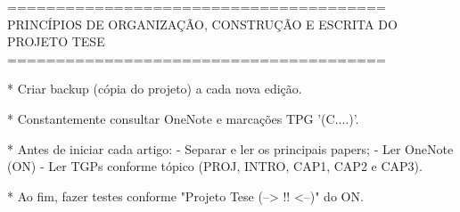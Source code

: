 =======================================
PRINCÍPIOS DE ORGANIZAÇÃO, CONSTRUÇÃO E ESCRITA DO PROJETO TESE
=======================================

* Criar backup (cópia do projeto) a cada nova edição.

* Constantemente consultar OneNote e marcações TPG '(C....)'. 

* Antes de iniciar cada artigo:
    - Separar e ler os principais papers;
    - Ler OneNote (ON)
    - Ler TGPs conforme tópico (PROJ, INTRO, CAP1, CAP2 e CAP3).

* Ao fim, fazer testes conforme "Projeto Tese (--> !! <--)" do ON.
